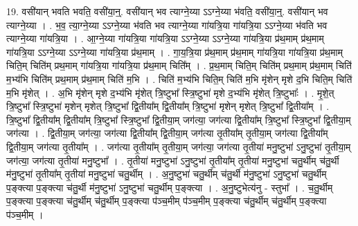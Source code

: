 \documentclass[17pt]{extarticle}
\begin{document}
19. वसी॑यान् भवति भवति॒ वसी॑या॒न्॒. वसी॑यान् भव त्याग्ने॒य्या ऽऽग्ने॒य्या भ॑वति॒ वसी॑या॒न्॒. वसी॑यान् भव त्याग्ने॒य्या । . भ॒व॒ त्या॒ग्ने॒य्या ऽऽग्ने॒य्या भ॑वति भव त्याग्ने॒य्या गा॑यत्रि॒या गा॑यत्रि॒या ऽऽग्ने॒य्या भ॑वति भव त्याग्ने॒य्या गा॑यत्रि॒या । . आ॒ग्ने॒य्या गा॑यत्रि॒या गा॑यत्रि॒या ऽऽग्ने॒य्या ऽऽग्ने॒य्या गा॑यत्रि॒या प्र॑थ॒माम् प्र॑थ॒माम् गा॑यत्रि॒या ऽऽग्ने॒य्या ऽऽग्ने॒य्या गा॑यत्रि॒या प्र॑थ॒माम् । . गा॒य॒त्रि॒या प्र॑थ॒माम् प्र॑थ॒माम् गा॑यत्रि॒या गा॑यत्रि॒या प्र॑थ॒माम् चिति॒म् चिति॑म् प्रथ॒माम् गा॑यत्रि॒या गा॑यत्रि॒या प्र॑थ॒माम् चिति᳚म् । . प्र॒थ॒माम् चिति॒म् चिति॑म् प्रथ॒माम् प्र॑थ॒माम् चिति॑ म॒भ्य॑भि चिति॑म् प्रथ॒माम् प्र॑थ॒माम् चिति॑ म॒भि । . चिति॑ म॒भ्य॑भि चिति॒म् चिति॑ म॒भि मृ॑शेन् मृशे द॒भि चिति॒म् चिति॑ म॒भि मृ॑शेत् । . अ॒भि मृ॑शेन् मृशे द॒भ्य॑भि मृ॑शेत् त्रि॒ष्टुभा᳚ स्त्रि॒ष्टुभा॑ मृशे द॒भ्य॑भि मृ॑शेत् त्रि॒ष्टुभाः᳚ । . मृ॒शे॒त् त्रि॒ष्टुभा᳚ स्त्रि॒ष्टुभा॑ मृशेन् मृशेत् त्रि॒ष्टुभा᳚ द्वि॒तीया᳚म् द्वि॒तीया᳚म् त्रि॒ष्टुभा॑ मृशेन् मृशेत् त्रि॒ष्टुभा᳚ द्वि॒तीया᳚म् । . त्रि॒ष्टुभा᳚ द्वि॒तीया᳚म् द्वि॒तीया᳚म् त्रि॒ष्टुभा᳚ स्त्रि॒ष्टुभा᳚ द्वि॒तीया॒म् जग॑त्या॒ जग॑त्या द्वि॒तीया᳚म् त्रि॒ष्टुभा᳚ स्त्रि॒ष्टुभा᳚ द्वि॒तीया॒म् जग॑त्या । . द्वि॒तीया॒म् जग॑त्या॒ जग॑त्या द्वि॒तीया᳚म् द्वि॒तीया॒म् जग॑त्या तृ॒तीया᳚म् तृ॒तीया॒म् जग॑त्या द्वि॒तीया᳚म् द्वि॒तीया॒म् जग॑त्या तृ॒तीया᳚म् । . जग॑त्या तृ॒तीया᳚म् तृ॒तीया॒म् जग॑त्या॒ जग॑त्या तृ॒तीया॑ मनु॒ष्टुभा॑ ऽनु॒ष्टुभा॑ तृ॒तीया॒म् जग॑त्या॒ जग॑त्या तृ॒तीया॑ मनु॒ष्टुभा᳚ । . तृ॒तीया॑ मनु॒ष्टुभा॑ ऽनु॒ष्टुभा॑ तृ॒तीया᳚म् तृ॒तीया॑ मनु॒ष्टुभा॑ चतु॒र्थीम् च॑तु॒र्थी म॑नु॒ष्टुभा॑ तृ॒तीया᳚म् तृ॒तीया॑ मनु॒ष्टुभा॑ चतु॒र्थीम् । . अ॒नु॒ष्टुभा॑ चतु॒र्थीम् च॑तु॒र्थी म॑नु॒ष्टुभा॑ ऽनु॒ष्टुभा॑ चतु॒र्थीम् प॒ङ्क्त्या प॒ङ्क्त्या च॑तु॒र्थी म॑नु॒ष्टुभा॑ ऽनु॒ष्टुभा॑ चतु॒र्थीम् प॒ङ्क्त्या । . अ॒नु॒ष्टुभेत्य॑नु - स्तुभा᳚ । . च॒तु॒र्थीम् प॒ङ्क्त्या प॒ङ्क्त्या च॑तु॒र्थीम् च॑तु॒र्थीम् प॒ङ्क्त्या प॑ञ्च॒मीम् प॑ञ्च॒मीम् प॒ङ्क्त्या च॑तु॒र्थीम् च॑तु॒र्थीम् प॒ङ्क्त्या प॑ञ्च॒मीम् । \newline
\end{document}
